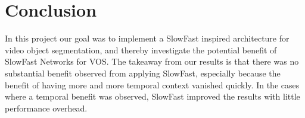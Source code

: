 \section{Conclusion}
In this project our goal was to implement a SlowFast inspired architecture for video object segmentation, and thereby investigate the potential benefit of SlowFast Networks for VOS. The takeaway from our results is that there was no substantial benefit observed from applying SlowFast, especially because the benefit of having more and more temporal context vanished quickly. In the cases where a temporal benefit was observed, SlowFast improved the results with little performance overhead.